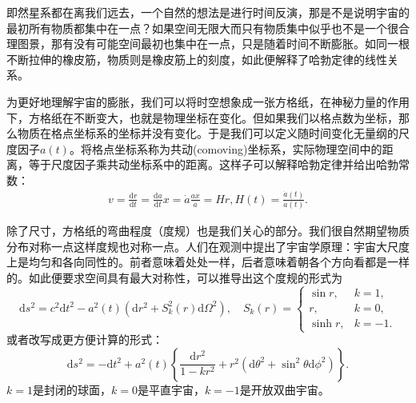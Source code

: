 \documentclass[../天体物理基础.tex]{subfiles}
\begin{document}
即然星系都在离我们远去，一个自然的想法是进行时间反演，那是不是说明宇宙的最初所有物质都集中在一点？如果空间无限大而只有物质集中似乎也不是一个很合理图景，那有没有可能空间最初也集中在一点，只是随着时间不断膨胀。如同一根不断拉伸的橡皮筋，物质则是橡皮筋上的刻度，如此便解释了哈勃定律的线性关系。

为更好地理解宇宙的膨胀，我们可以将时空想象成一张方格纸，在神秘力量的作用下，方格纸在不断变大，也就是物理坐标在变化。但如果我们以格点数为坐标，那么物质在格点坐标系的坐标并没有变化。于是我们可以定义随时间变化无量纲的尺度因子$a\left(t\right)$。将格点坐标系称为共动(comoving)坐标系，实际物理空间中的距离，等于尺度因子乘共动坐标系中的距离。这样子可以解释哈勃定律并给出哈勃常数：
\begin{align}
v=\frac{\mathrm{d}r}{\mathrm{d}t}=\frac{\mathrm{d}a}{\mathrm{d}t}x=\dot{a}\frac{ax}{a}=Hr,H\left(t\right)=\frac{\dot a\left(t\right)}{a\left(t\right)}.
\end{align}

除了尺寸，方格纸的弯曲程度（度规）也是我们关心的部分。我们很自然期望物质分布对称一点这样度规也对称一点。人们在观测中提出了宇宙学原理：宇宙大尺度上是均匀和各向同性的。前者意味着处处一样，后者意味着朝各个方向看都是一样的。如此便要求空间具有最大对称性，可以推导出这个度规的形式为
\begin{equation}
\mathrm{d}s^{2}=c^{2}\mathrm{d}t^{2}-a^{2}\left(t\right)\left(\mathrm{d}r^{2}+S_{k}^{2}\left(r\right)\mathrm{d}\Omega^{2}\right),\quad S_{k}\left(r\right)=
\begin{cases}
\sin r,&k=1,\\
r,&k=0,\\
\sinh r,&k=-1.
\end{cases}
\end{equation}
或者改写成更方便计算的形式：
\begin{equation}
\mathrm{d}s^{2}=-\mathrm{d}t^{2}+a^{2}\left(t\right)\left\{\frac{\mathrm{d}r^{2}}{1-kr^{2}}+r^{2}\left(\mathrm{d}\theta^{2}+\sin^{2}\theta\mathrm{d}\phi^{2}\right)\right\}.\label{1.6.4}
\end{equation}
$k=1$是封闭的球面，$k=0$是平直宇宙，$k=-1$是开放双曲宇宙。
\end{document}

